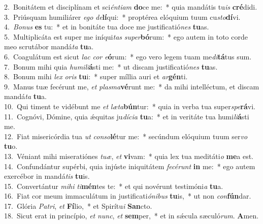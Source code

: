 {2.~}Bonitátem et disciplínam et sci\textit{én}\textit{ti}\textit{am} \textbf{do}ce me:~* quia mandátis tu\textit{is} \textbf{cré}didi.\\
{3.~}Priúsquam humiliárer \textit{e}\textit{go} \textit{de}\textbf{lí}qui:~* proptérea elóquium tuum cu\textit{sto}\textbf{dí}vi.\\
{4.~}\textit{Bo}\textit{nus} \textbf{es} tu:~* et in bonitáte tua doce me justificatió\textit{nes} \textbf{tu}as.\\
{5.~}Multiplicáta est super me iníqui\textit{tas} \textit{su}\textit{per}\textbf{bó}rum:~* ego autem in toto corde meo scrutábor mandá\textit{ta} \textbf{tu}a.\\
{6.~}Coagulátum est sicut \textit{lac} \textit{cor} \textit{e}\textbf{ó}rum:~* ego vero legem tuam me\textit{di}\textbf{tá}tus sum.\\
{7.~}Bonum mihi quia \textit{hu}\textit{mi}\textit{li}\textbf{á}sti me:~* ut discam justificatió\textit{nes} \textbf{tu}as.\\
{8.~}Bonum mihi \textit{lex} \textit{o}\textit{ris} \textbf{tu}i:~* super míllia auri et \textit{ar}\textbf{gén}ti.\\
{9.~}Manus tuæ fecérunt me, \textit{et} \textit{plas}\textit{ma}\textbf{vé}runt me:~* da mihi intelléctum, et discam mandá\textit{ta} \textbf{tu}a.\\
{10.~}Qui timent te vidébunt me \textit{et} \textit{læ}\textit{ta}\textbf{bún}tur:~* quia in verba tua super\textit{spe}\textbf{rá}vi.\\
{11.~}Cognóvi, Dómine, quia ǽquitas ju\textit{dí}\textit{ci}\textit{a} \textbf{tu}a:~* et in veritáte tua humi\textit{li}\textbf{á}sti me.\\
{12.~}Fiat misericórdia tua \textit{ut} \textit{con}\textit{so}\textbf{lé}tur me:~* secúndum elóquium tuum ser\textit{vo} \textbf{tu}o.\\
{13.~}Véniant mihi miseratiónes \textit{tu}\textit{æ}, \textit{et} \textbf{vi}vam:~* quia lex tua meditáti\textit{o} \textbf{me}a est.\\
{14.~}Confundántur supérbi, quia injúste iniquitátem \textit{fe}\textit{cé}\textit{runt} \textbf{in} me:~* ego autem exercébor in mandá\textit{tis} \textbf{tu}is.\\
{15.~}Convertántur \textit{mi}\textit{hi} \textit{ti}\textbf{mén}tes te:~* et qui novérunt testimóni\textit{a} \textbf{tu}a.\\
{16.~}Fiat cor meum immaculátum in justificati\textit{ó}\textit{ni}\textit{bus} \textbf{tu}is,~* ut non \textit{con}\textbf{fún}dar.\\
{17.~}Glória \textit{Pa}\textit{tri}, \textit{et} \textbf{Fí}lio,~* et Spirítu\textit{i} \textbf{San}cto.\\
{18.~}Sicut erat in princípio, \textit{et} \textit{nunc}, \textit{et} \textbf{sem}per,~* et in sǽcula sæculó\textit{rum}. \textbf{A}men.\\
